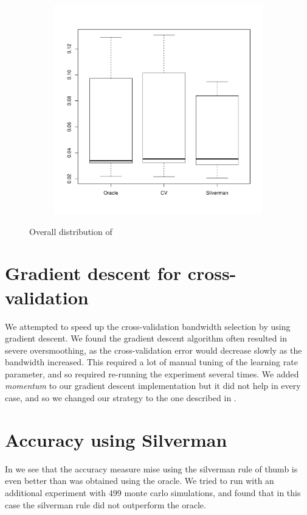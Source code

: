 \begin{figure}[htbp]
\begin{subfigure}[t]{0.45\textwidth}
        \includegraphics[width=\textwidth]{results/by_overall/relative-centroid-drift-peakpop-boxplot}
        \label{fig:discussion:overall_centroiddrift_boxplot:peak}
    \end{subfigure}
    \caption{Overall distribution of }
    \label{fig:discussion:overall_centroiddrift_boxplot}
\end{figure}

\section{Gradient descent for cross-validation}
\label{sec:discussion:gradient_descent}

We attempted to speed up the cross-validation bandwidth selection by using gradient descent.
We found the gradient descent algorithm often resulted in severe oversmoothing,
as the cross-validation error would decrease slowly as the bandwidth increased.
This required a lot of manual tuning of the learning rate parameter, and so required re-running the experiment several times.
We added \textit{momentum} to our gradient descent implementation but it did not help in every case, and so we changed our strategy to the one described in .

\section{Accuracy using Silverman}

In  we see that the accuracy measure \gls{mise} using the \gls{silverman} rule of thumb is even better than was obtained using the \gls{oracle}.
We tried to run with an additional experiment with 499 monte carlo simulations, and found that in this case the \gls{silverman} rule did not outperform the \gls{oracle}.

